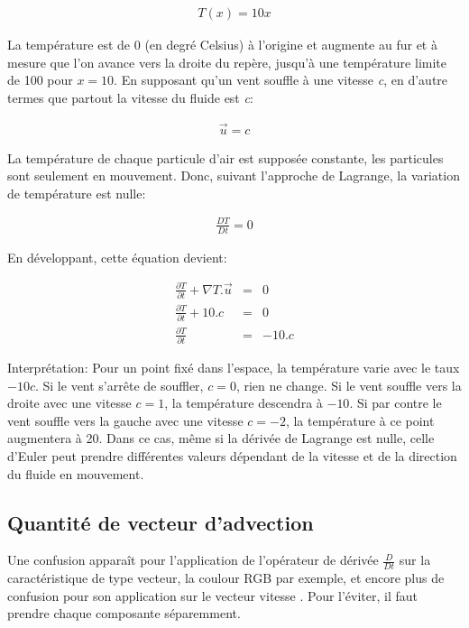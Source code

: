 \documentclass[11pt]{report}
\begin{document}
\begin{eqnarray*}
T(x) = 10 x
\end{eqnarray*}

La température est de 0 (en degré Celsius) à l'origine et augmente au fur et à mesure que l'on avance vers la droite du repère, jusqu'à une température limite de 100 pour $x = 10 $. En supposant qu'un vent souffle à une vitesse \textit{c},  en d'autre termes que partout la vitesse du fluide est \textit{c}:

\begin{eqnarray*}
\overrightarrow{u} = c
\end{eqnarray*}

La température de chaque particule d'air est supposée constante, les particules sont seulement en mouvement. Donc, suivant l'approche de Lagrange, la variation de température est nulle:

\begin{eqnarray*}
\frac{DT}{Dt} = 0
\end{eqnarray*} 

En développant, cette équation devient:

\begin{eqnarray*}
\frac{\partial T}{\partial t} + \nabla T.\overrightarrow{u} & = & 0 \\
\frac{\partial T}{\partial t} + 10.c & = & 0 \\
\frac{\partial T}{\partial t}  & = & - 10.c
\end{eqnarray*} 

Interprétation: Pour un point fixé dans l'espace, la température varie avec le taux $ -10c $. Si le vent s'arrête de souffler, $ c = 0 $, rien ne change. Si le vent souffle vers la droite avec une vitesse $ c = 1 $, la température descendra à $ -10 $. Si par contre le vent souffle vers la gauche avec une vitesse $ c = -2 $, la température à ce point augmentera à 20. Dans ce cas, même si la dérivée de Lagrange est nulle, celle d'Euler peut prendre différentes valeurs dépendant de la vitesse et de la direction du fluide en mouvement. 


\subsection{Quantité de vecteur d'advection}

Une confusion apparaît pour l'application de l'opérateur de dérivée $ \frac{D}{Dt} $ sur la caractéristique de type vecteur, la coulour RGB par exemple, et encore plus de confusion pour son application sur le vecteur vitesse . Pour l'éviter, il faut prendre chaque composante séparemment.
\end{document}
